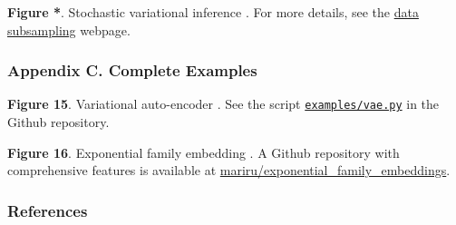\textbf{Figure *}. Stochastic variational inference \citep{hoffman2013stochastic}.
For more details, see the
\href{/api/inference-data-subsampling}{data subsampling} webpage.

\subsubsection{Appendix C. Complete Examples}

\textbf{Figure 15}. Variational auto-encoder
\citep{kingma2014auto,rezende2014stochastic}.
See the script
\href{https://github.com/blei-lab/edward/blob/master/examples/vae.py}{\texttt{examples/vae.py}}
in the Github repository.

\textbf{Figure 16}. Exponential family embedding \citep{rudolph2016exponential}.
A Github repository with comprehensive features is available at
\href{https://github.com/mariru/exponential_family_embeddings}{mariru/exponential_family_embeddings}.

\subsubsection{References}\label{references}
